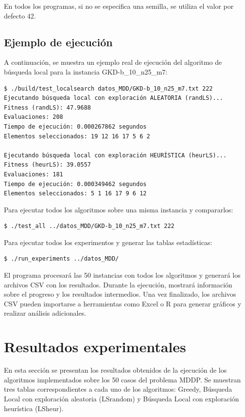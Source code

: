 \documentclass{article}
\begin{document}
En todos los programas, si no se especifica una semilla, se utiliza el valor por defecto 42.

\subsection{Ejemplo de ejecución}

A continuación, se muestra un ejemplo real de ejecución del algoritmo de búsqueda local para la instancia GKD-b\_10\_n25\_m7:

\begin{verbatim}
$ ./build/test_localsearch datos_MDD/GKD-b_10_n25_m7.txt 222
Ejecutando búsqueda local con exploración ALEATORIA (randLS)...
Fitness (randLS): 47.9688
Evaluaciones: 208
Tiempo de ejecución: 0.000267862 segundos
Elementos seleccionados: 19 12 16 17 5 6 2 

Ejecutando búsqueda local con exploración HEURÍSTICA (heurLS)...
Fitness (heurLS): 39.0557
Evaluaciones: 181
Tiempo de ejecución: 0.000349462 segundos
Elementos seleccionados: 5 1 16 17 9 6 12 
\end{verbatim}

Para ejecutar todos los algoritmos sobre una misma instancia y compararlos:

\begin{verbatim}
$ ./test_all ../datos_MDD/GKD-b_10_n25_m7.txt 222
\end{verbatim}

Para ejecutar todos los experimentos y generar las tablas estadísticas:

\begin{verbatim}
$ ./run_experiments ../datos_MDD/
\end{verbatim}

El programa procesará las 50 instancias con todos los algoritmos y generará los archivos CSV con los resultados. Durante la ejecución, mostrará información sobre el progreso y los resultados intermedios. Una vez finalizado, los archivos CSV pueden importarse a herramientas como Excel o R para generar gráficos y realizar análisis adicionales.

\section{Resultados experimentales}

En esta sección se presentan los resultados obtenidos de la ejecución de los algoritmos implementados sobre los 50 casos del problema MDDP. Se muestran tres tablas correspondientes a cada uno de los algoritmos: Greedy, Búsqueda Local con exploración aleatoria (LSrandom) y Búsqueda Local con exploración heurística (LSheur).
\end{document}
